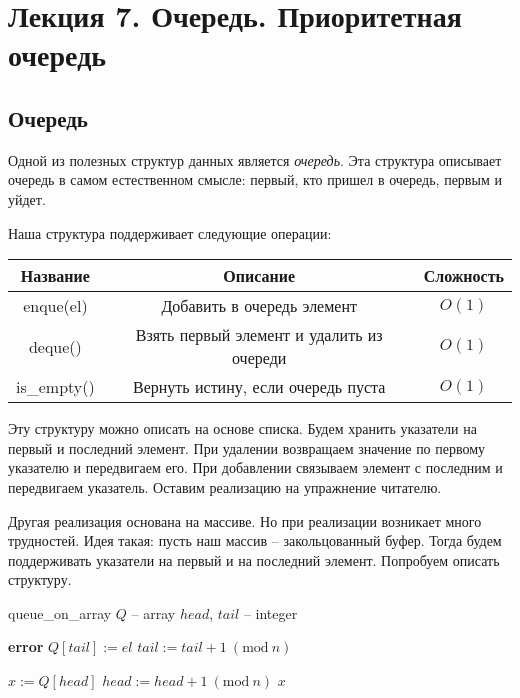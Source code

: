 \documentclass[../main.tex]{subfiles}
\begin{document}
	\section{Лекция 7. Очередь. Приоритетная очередь}
	
	\subsection{Очередь}
	
	Одной из полезных структур данных является \textit{очередь}. Эта структура описывает очередь в самом естественном смысле: первый, кто пришел в очередь, первым и уйдет.
	
	Наша структура поддерживает следующие операции:
	
	\begin{center}
		\begin{tabular}{c|c|c}
			Название & Описание & Сложность \\ \hline
			enque(el) & Добавить в очередь элемент & $ O(1) $ \\ \hline
			deque() & Взять первый элемент и удалить из очереди & $ O(1) $ \\ \hline
			is\_empty() & Вернуть истину, если очередь пуста & $ O(1) $	
		\end{tabular}
	\end{center}
	
	Эту структуру можно описать на основе списка. Будем хранить указатели на первый и последний элемент. При удалении возвращаем значение по первому указателю и передвигаем его. При добавлении связываем элемент с последним и передвигаем указатель. Оставим реализацию на упражнение читателю.
	
	Другая реализация основана на массиве. Но при реализации возникает много трудностей. Идея такая: пусть наш массив -- закольцованный буфер. Тогда будем поддерживать указатели на первый и на последний элемент. Попробуем описать структуру.
	
	\begin{struct}{queue\_on\_array}
		\State $Q$ -- array 
		\State $head$, $tail$ -- integer
		
		\State
		
				\State \Return \textbf{error}
			\EndIf
			\State $Q[tail] := el$
			\State $tail := tail + 1 \ (\text{mod} \ n)$
		\EndFunction
	
		\State
		
			\State $x := Q[head]$
			\State $head := head + 1 \ (\text{mod} \ n)$ 
			\State \Return $x$
		\EndFunction
	\end{struct}
	
\end{document}
